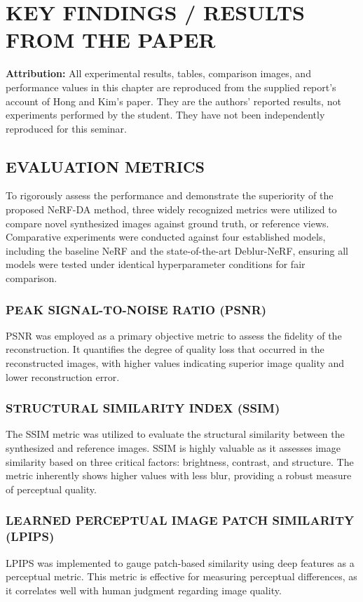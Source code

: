 \chapter{\MakeUppercase{Key Findings / Results from the Paper}}
\setcounter{equation}{0}

\noindent\textbf{Attribution:} All experimental results, tables, comparison images, and performance values in this chapter are reproduced from the supplied report's account of Hong and Kim's paper. They are the authors' reported results, not experiments performed by the student. They have not been independently reproduced for this seminar.\cite{bib1}

\section{\MakeUppercase{Evaluation Metrics}}
To rigorously assess the performance and demonstrate the superiority of the proposed NeRF-DA method, three widely recognized metrics were utilized to compare novel synthesized images against ground truth, or reference views. Comparative experiments were conducted against four established models, including the baseline NeRF and the state-of-the-art Deblur-NeRF, ensuring all models were tested under identical hyperparameter conditions for fair comparison.\cite{bib4}

\subsection{\MakeUppercase{Peak Signal-to-Noise Ratio (PSNR)}}
PSNR was employed as a primary objective metric to assess the fidelity of the reconstruction. It quantifies the degree of quality loss that occurred in the reconstructed images, with higher values indicating superior image quality and lower reconstruction error.

\subsection{\MakeUppercase{Structural Similarity Index (SSIM)}}
The SSIM metric was utilized to evaluate the structural similarity between the synthesized and reference images. SSIM is highly valuable as it assesses image similarity based on three critical factors: brightness, contrast, and structure. The metric inherently shows higher values with less blur, providing a robust measure of perceptual quality.

\subsection{\MakeUppercase{Learned Perceptual Image Patch Similarity (LPIPS)}}
LPIPS was implemented to gauge patch-based similarity using deep features as a perceptual metric. This metric is effective for measuring perceptual differences, as it correlates well with human judgment regarding image quality.

